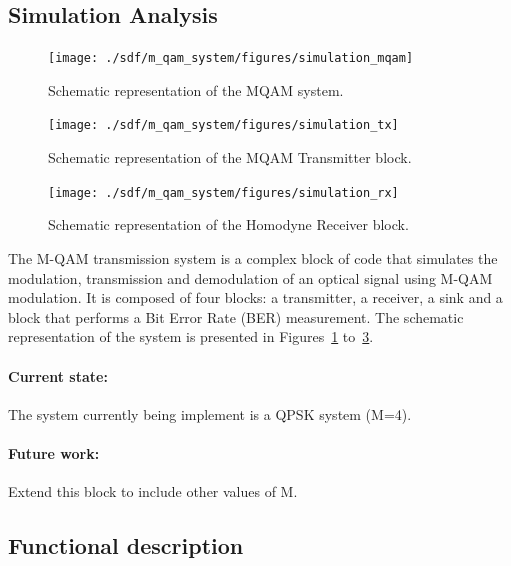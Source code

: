 \begin{refsection}
\subsection{Simulation Analysis}

\begin{figure}[h]
	\centering
	\texttt{[image: ./sdf/m\_qam\_system/figures/simulation\_mqam]}
	\caption{Schematic representation of the MQAM system.}\label{fig:MQAM_system_block_diagram}
\end{figure}


\begin{figure}[h]
	\centering
	\texttt{[image: ./sdf/m\_qam\_system/figures/simulation\_tx]}
	\caption{Schematic representation of the MQAM Transmitter block.}\label{fig:simulation_tx}
\end{figure}


\begin{figure}[h]
	\centering
	\texttt{[image: ./sdf/m\_qam\_system/figures/simulation\_rx]}
	\caption{Schematic representation of the Homodyne Receiver block.}\label{fig:simulation_rx}
\end{figure}

The M-QAM transmission system is a complex block of code that simulates the modulation, transmission and
demodulation of an optical signal using M-QAM modulation.
It is composed of four blocks: a transmitter, a receiver, a sink and a block that performs a Bit Error Rate (BER) measurement. The schematic representation of the
system is presented in Figures~\ref{fig:MQAM_system_block_diagram} to~\ref{fig:simulation_rx}.
	
\paragraph{Current state:} The system currently being implement is a QPSK system (M=4).

\paragraph{Future work:} Extend this block to include other values of M.

\subsection*{Functional description}


\end{refsection}
